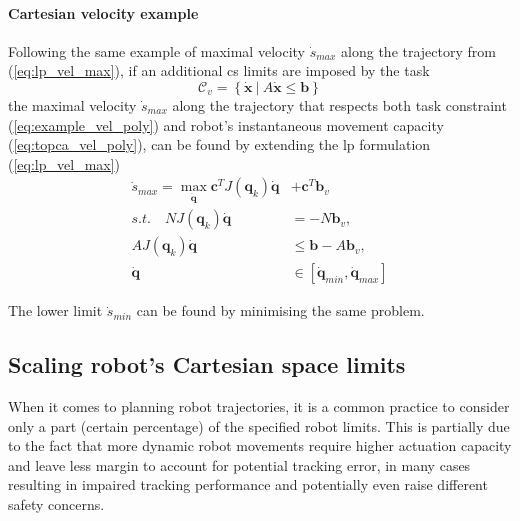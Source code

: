 \paragraph*{Cartesian velocity example} Following the same example of maximal velocity $\dot{s}_{max}$ along the trajectory from (\ref{eq:lp_vel_max}), if an additional \gls{cs} limits are imposed by the task 
\begin{equation}
\mathcal{C}_v = \left\{ \dot{\bm{x}} ~|~ A \dot{\bm{x}} \leq \bm{b} \right\}
\label{eq:example_vel_poly}
\end{equation}
the maximal velocity $\dot{s}_{max}$ along the trajectory that respects both task constraint (\ref{eq:example_vel_poly}) and robot's instantaneous movement capacity (\ref{eq:topca_vel_poly}), can be found by extending the \gls{lp} formulation (\ref{eq:lp_vel_max})
\begin{equation}
\begin{split}
    \dot{s}_{max} = \max_{\dot{\bm{q}}} \bm{c}^TJ(\bm{q}_k)\dot{\bm{q}} &+ \bm{c}^T\bm{b}_v  \\
    s.t.\quad NJ(\bm{q}_k)\dot{\bm{q}} &= - N\bm{b}_v, \\
    AJ(\bm{q}_k)\dot{\bm{q}} &\leq \bm{b} - A\bm{b}_v, \\
    \dot{\bm{q}}&\in [\dot{\bm{q}}_{min}, \dot{\bm{q}}_{max}]
\end{split}\label{eq:lp_vel_max_additional}
\end{equation}

The lower limit $\dot{s}_{min}$ can be found by minimising the same problem.


\subsection{Scaling robot's Cartesian space limits}

When it comes to planning robot trajectories, it is a common practice to consider only a part (certain percentage) of the specified robot limits. This is partially due to the fact that more dynamic robot movements require higher actuation capacity and leave less margin to account for potential tracking error, in many cases resulting in impaired tracking performance and potentially even raise different safety concerns.

